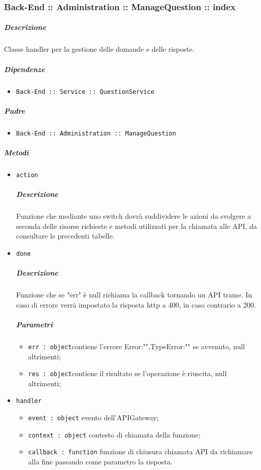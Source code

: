 \documentclass[../ManualeSviluppatore_v1.0.0.tex]{subfiles}
\begin{document}
\subsubsection{Back-End :: Administration :: ManageQuestion :: index}
\subparagraph{Descrizione} Classe handler per la gestione delle domande e delle risposte.
\subparagraph{Dipendenze}
\begin{itemize}
	\item \texttt{Back-End :: Service :: QuestionService}
\end{itemize}
\subparagraph{Padre}
\begin{itemize}
	\item \texttt{Back-End :: Administration :: ManageQuestion}
\end{itemize}
\subparagraph{Metodi}
\begin{itemize}
	\item \texttt{action}
	      \subparagraph{Descrizione} Funzione che mediante uno switch dovrà suddividere le azioni da svolgere a seconda delle risorse richieste e metodi utilizzati per la chiamata alle API, da consultare le precedenti tabelle.
	\item \texttt{done}
	      \subparagraph{Descrizione} Funzione che se "err" è null richiama la callback tornando un API trame. In caso di errore verrà impostato la risposta http a 400, in caso contrario a 200.
	      \subparagraph{Parametri}
	      \begin{itemize}
	      	\item \texttt{err : object}contiene l'errore {Error:"",TypeError:""} se avvenuto, null altrimenti;
	      	\item \texttt{res : object}contiene il risultato se l'operazione è riuscita, null altrimenti;
	      \end{itemize}
	\item \texttt{handler}
	      \begin{itemize}
	      	\item \texttt{event : object} evento dell'APIGateway;
	      	\item \texttt{context : object} contesto di chiamata della funzione;
	      	\item \texttt{callback : function} funzione di chiusura chiamata API da richiamare alla fine passando come parametro la risposta.
	      \end{itemize}
\end{itemize}
\end{document}
